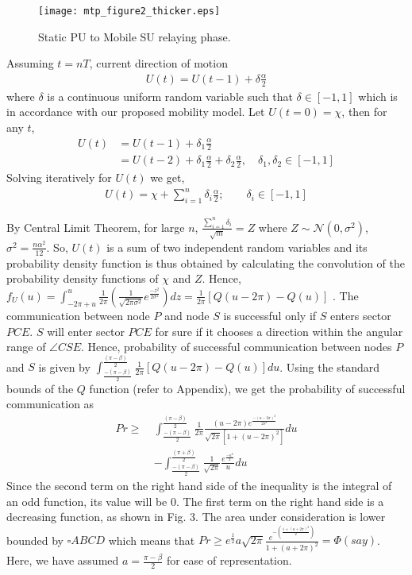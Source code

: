 \documentclass[conference]{IEEEtran}
\begin{document}
\begin{figure}[ht] \centering \label{con} \texttt{[image: mtp\_figure2\_thicker.eps]}\\
\caption{Static PU to Mobile SU relaying phase.} 
\vspace{0.05in}
\end{figure}

Assuming $t=nT$, current direction of motion
\begin{gather*}
U(t)=U(t-1)+\delta\frac{\alpha}{2}
\end{gather*}
where $\delta$ is a continuous uniform random variable such that $\delta\in[-1,1]$ which is in accordance with our proposed mobility model. Let $U(t=0)=\chi$, then for any $t$,
\begin{align*}
U(t)&=U(t-1)+\delta_1\frac{\alpha}{2}\\
&=U(t-2)+\delta_1\frac{\alpha}{2}+\delta_2\frac{\alpha}{2},\quad\delta_1,\delta_2\in[-1,1]
\end{align*}
Solving iteratively for $U(t)$ we get,
\begin{gather*}
U(t)=\chi+\sum_{i=1}^{n}\delta_i\frac{\alpha}{2} ; \quad\quad\delta_i\in[-1,1]
\end{gather*}

By Central Limit Theorem, for large $n$, $\frac{\sum_{i=1}^{n}\delta_i}{\sqrt{m}}=Z$ where $Z\sim\mathcal{N}(0,\sigma^2)$, ${\sigma^2}=\frac{n\alpha^2}{12}$. So, $U(t)$ is a sum of two independent random variables and its probability density function is thus obtained by 
calculating the convolution of the probability density functions of $\chi$ and $Z$. Hence, $f_U(u)=\displaystyle\int_{-2\pi+u}^{u}\frac{1}{2\pi}(\frac{1}{\sqrt{2\pi\sigma^2}}e^\frac{-z^2}{2\sigma^2})dz=\frac{1}{2\pi}[Q(u-2\pi)-Q(u)]$ .
The communication between node $P$ and node $S$ is successful only if $S$ enters sector ${PCE}$. $S$ will enter sector ${PCE}$ for sure if it chooses a direction within the angular range of $\angle{CSE}$.
Hence, probability of successful communication between nodes $P$ and $S$ is given by $\displaystyle\int_{\frac{-(\pi-\beta)}{2}}^{\frac{(\pi-\beta)}{2}}\frac{1}{2\pi}[Q(u-2\pi)-Q(u)]du$. Using the standard bounds of the $Q$ function (refer to Appendix), we get the probability of successful communication as
\begin{align*}
Pr\geq\ &\displaystyle\int_{\frac{-(\pi-\beta)}{2}}^{\frac{(\pi-\beta)}{2}}\frac{1}{2\pi}\frac{(u-2\pi)e^\frac{-(u-2\pi)^2}{2\sigma^2}}{\sqrt{2\pi}[1+(u-2\pi)^2]}du\\
&-\displaystyle\int_{\frac{-(\pi-\beta)}{2}}^{\frac{(\pi+\beta)}{2}}{\frac{1}{\sqrt{2\pi}}}\frac{e^{\frac{-u^2}{2}}}{u}du
\end{align*}
Since the second term on the right hand side of the inequality is the integral of an odd function, its value will be $0$. The first term on the right hand side is a decreasing 
function, as shown in Fig. 3. The area under consideration is lower bounded by $\square{ABCD}$ which means that $Pr\geq{{e^{\frac{1}{2}}}a\sqrt{2\pi}}\frac{e^{-(\frac{1+(a+2\pi)^2}
{2})}}{1+(a+2\pi)^2}=\Phi(say)$. Here, we have assumed $a=\frac{\pi-\beta}{2}$ for ease of representation.
\end{document}
